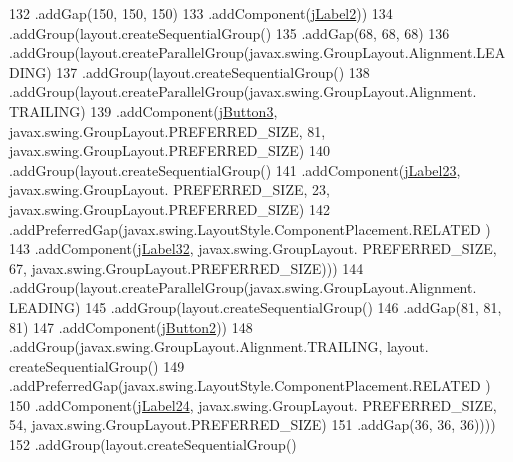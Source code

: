 \begin{DoxyCode}
132                         .addGap(150, 150, 150)
133                         .addComponent(\mbox{\hyperlink{classinterfacessoguar_1_1paenrique_a213ee92d0638dee5a178c9c6fcc5befc}{jLabel2}}))
134                     .addGroup(layout.createSequentialGroup()
135                         .addGap(68, 68, 68)
136                         .addGroup(layout.createParallelGroup(javax.swing.GroupLayout.Alignment.LEADING)
137                             .addGroup(layout.createSequentialGroup()
138                                 .addGroup(layout.createParallelGroup(javax.swing.GroupLayout.Alignment.
      TRAILING)
139                                     .addComponent(\mbox{\hyperlink{classinterfacessoguar_1_1paenrique_ac5655995cee95415c5fa0bfd6eb58b49}{jButton3}}, javax.swing.GroupLayout.PREFERRED\_SIZE,
       81, javax.swing.GroupLayout.PREFERRED\_SIZE)
140                                     .addGroup(layout.createSequentialGroup()
141                                         .addComponent(\mbox{\hyperlink{classinterfacessoguar_1_1paenrique_a925293df4e0f65ac4b51ef429935f333}{jLabel23}}, javax.swing.GroupLayout.
      PREFERRED\_SIZE, 23, javax.swing.GroupLayout.PREFERRED\_SIZE)
142                                         .addPreferredGap(javax.swing.LayoutStyle.ComponentPlacement.RELATED
      )
143                                         .addComponent(\mbox{\hyperlink{classinterfacessoguar_1_1paenrique_a3b351505fc92b75748aed4174668f4c0}{jLabel32}}, javax.swing.GroupLayout.
      PREFERRED\_SIZE, 67, javax.swing.GroupLayout.PREFERRED\_SIZE)))
144                                 .addGroup(layout.createParallelGroup(javax.swing.GroupLayout.Alignment.
      LEADING)
145                                     .addGroup(layout.createSequentialGroup()
146                                         .addGap(81, 81, 81)
147                                         .addComponent(\mbox{\hyperlink{classinterfacessoguar_1_1paenrique_a893537fc97884d87f31ed05c28ffa158}{jButton2}}))
148                                     .addGroup(javax.swing.GroupLayout.Alignment.TRAILING, layout.
      createSequentialGroup()
149                                         .addPreferredGap(javax.swing.LayoutStyle.ComponentPlacement.RELATED
      )
150                                         .addComponent(\mbox{\hyperlink{classinterfacessoguar_1_1paenrique_a2ac7ac55fe97038c90f1e66dd1af19d0}{jLabel24}}, javax.swing.GroupLayout.
      PREFERRED\_SIZE, 54, javax.swing.GroupLayout.PREFERRED\_SIZE)
151                                         .addGap(36, 36, 36))))
152                             .addGroup(layout.createSequentialGroup()

\end{DoxyCode}
